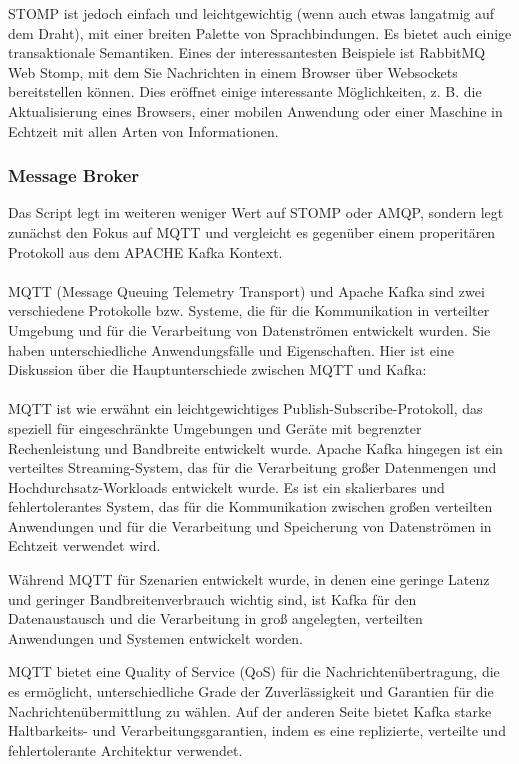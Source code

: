 STOMP ist jedoch einfach und leichtgewichtig (wenn auch etwas langatmig auf dem Draht), mit einer breiten Palette von Sprachbindungen. Es bietet auch einige transaktionale Semantiken. Eines der interessantesten Beispiele ist RabbitMQ Web Stomp, mit dem Sie Nachrichten in einem Browser über Websockets bereitstellen können. Dies eröffnet einige interessante Möglichkeiten, z. B. die Aktualisierung eines Browsers, einer mobilen Anwendung oder einer Maschine in Echtzeit mit allen Arten von Informationen.

\subsubsection{Message Broker}
Das Script legt im weiteren weniger Wert auf STOMP oder AMQP, sondern legt zunächst den Fokus auf MQTT und vergleicht es gegenüber einem properitären Protokoll aus dem APACHE Kafka Kontext.
\\\\
MQTT (Message Queuing Telemetry Transport) und Apache Kafka sind zwei verschiedene Protokolle bzw. Systeme, die für die Kommunikation in verteilter Umgebung und für die Verarbeitung von Datenströmen entwickelt wurden. Sie haben unterschiedliche Anwendungsfälle und Eigenschaften. Hier ist eine Diskussion über die Hauptunterschiede zwischen MQTT und Kafka:
\\\\
MQTT ist wie erwähnt ein leichtgewichtiges Publish-Subscribe-Protokoll, das speziell für eingeschränkte Umgebungen und Geräte mit begrenzter Rechenleistung und Bandbreite entwickelt wurde. Apache Kafka hingegen ist ein verteiltes Streaming-System, das für die Verarbeitung großer Datenmengen und Hochdurchsatz-Workloads entwickelt wurde. Es ist ein skalierbares und fehlertolerantes System, das für die Kommunikation zwischen großen verteilten Anwendungen und für die Verarbeitung und Speicherung von Datenströmen in Echtzeit verwendet wird.

Während MQTT für Szenarien entwickelt wurde, in denen eine geringe Latenz und geringer Bandbreitenverbrauch wichtig sind, ist Kafka für den Datenaustausch und die Verarbeitung in groß angelegten, verteilten Anwendungen und Systemen entwickelt worden.

MQTT bietet eine Quality of Service (QoS) für die Nachrichtenübertragung, die es ermöglicht, unterschiedliche Grade der Zuverlässigkeit und Garantien für die Nachrichtenübermittlung zu wählen. Auf der anderen Seite bietet Kafka starke Haltbarkeits- und Verarbeitungsgarantien, indem es eine replizierte, verteilte und fehlertolerante Architektur verwendet.

